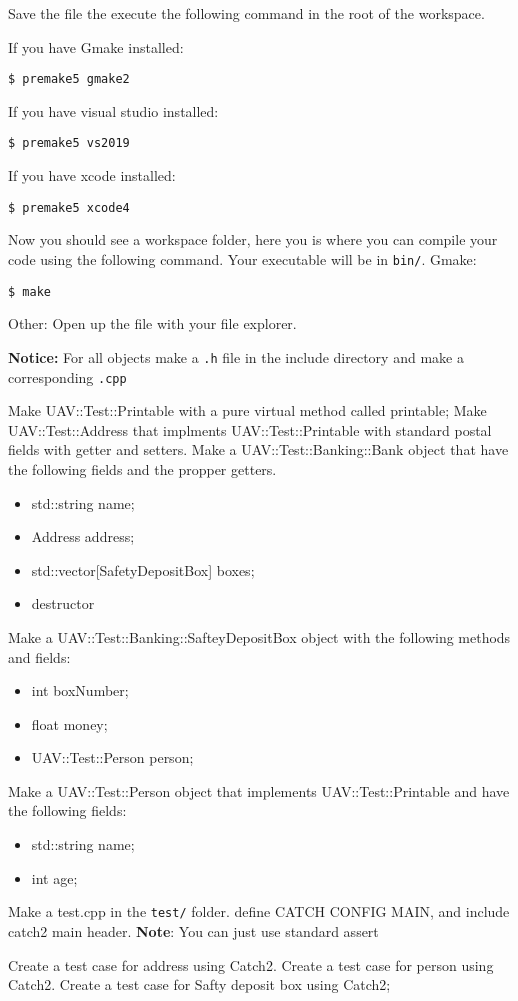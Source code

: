 \documentclass[10pt]{exam}
\begin{document}
Save the file the execute the following command in the root of the workspace.

If you have Gmake installed:
\begin{lstlisting}
$ premake5 gmake2
\end{lstlisting}

If you have visual studio installed:
\begin{lstlisting}
$ premake5 vs2019
\end{lstlisting}

If you have xcode installed:
\begin{lstlisting}
$ premake5 xcode4
\end{lstlisting}

Now you should see a workspace folder, here you is where you can compile your code using the following command. Your executable will be in \lstinline{bin/}.
Gmake:
\begin{lstlisting}
$ make
\end{lstlisting}

Other:
Open up the file with your file explorer.

\newpage

\textbf{Notice:} For all objects make a \lstinline{.h} file in the include directory and make a corresponding \lstinline{.cpp}
\begin{questions}
\question Make UAV::Test::Printable with a pure virtual method called printable;
\question Make UAV::Test::Address that implments UAV::Test::Printable with standard postal fields with getter and setters.
\question Make a UAV::Test::Banking::Bank object that have the following fields and the propper getters.
\begin{itemize}
\item std::string name;
\item Address address;
\item std::vector[SafetyDepositBox] boxes;
\item destructor
\end{itemize}

\question Make a UAV::Test::Banking::SafteyDepositBox object with the following methods and fields:
\begin{itemize}
\item int boxNumber;
\item float money;
\item UAV::Test::Person person;
\end{itemize}

\question Make a UAV::Test::Person object that implements UAV::Test::Printable and have the following fields:
\begin{itemize}
\item std::string name;
\item int age;
\end{itemize}

\question Make a test.cpp in the \lstinline{test/} folder. define CATCH CONFIG MAIN, and include catch2 main header. \textbf{Note}: You can just use standard assert

\question Create a test case for address using Catch2.
\question Create a test case for person using Catch2.
\question Create a test case for Safty deposit box using Catch2;
\end{questions}
\end{document}
